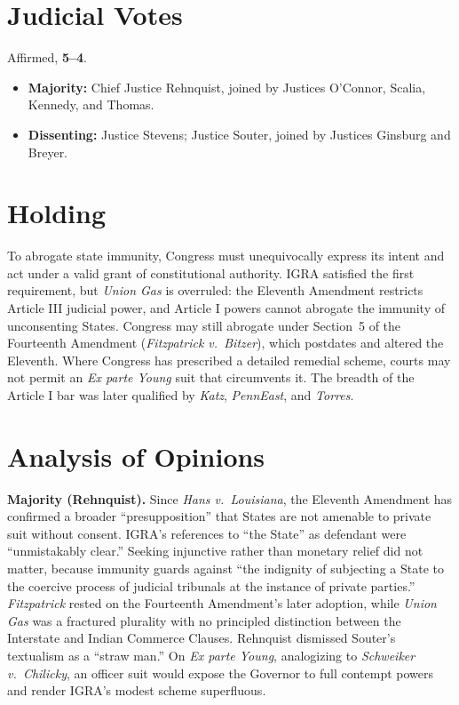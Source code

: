 \documentclass[12pt]{article}
\begin{document}
\section{Judicial Votes}

Affirmed, \textbf{5--4}.
\begin{itemize}
\item \textbf{Majority:} Chief Justice Rehnquist, joined by Justices O'Connor, Scalia, Kennedy, and Thomas.
\item \textbf{Dissenting:} Justice Stevens; Justice Souter, joined by Justices Ginsburg and Breyer.
\end{itemize}

\section{Holding}

To abrogate state immunity, Congress must unequivocally express its intent and act under a valid grant of constitutional authority. IGRA satisfied the first requirement, but \textit{Union Gas} is overruled: the Eleventh Amendment restricts Article III judicial power, and Article I powers cannot abrogate the immunity of unconsenting States. Congress may still abrogate under Section~5 of the Fourteenth Amendment (\textit{Fitzpatrick v.\ Bitzer}), which postdates and altered the Eleventh. Where Congress has prescribed a detailed remedial scheme, courts may not permit an \textit{Ex parte Young} suit that circumvents it. The breadth of the Article I bar was later qualified by \textit{Katz}, \textit{PennEast}, and \textit{Torres}.

\section{Analysis of Opinions}

\textbf{Majority (Rehnquist).} Since \textit{Hans v.\ Louisiana}, the Eleventh Amendment has confirmed a broader ``presupposition'' that States are not amenable to private suit without consent. IGRA's references to ``the State'' as defendant were ``unmistakably clear.'' Seeking injunctive rather than monetary relief did not matter, because immunity guards against ``the indignity of subjecting a State to the coercive process of judicial tribunals at the instance of private parties.'' \textit{Fitzpatrick} rested on the Fourteenth Amendment's later adoption, while \textit{Union Gas} was a fractured plurality with no principled distinction between the Interstate and Indian Commerce Clauses. Rehnquist dismissed Souter's textualism as a ``straw man.'' On \textit{Ex parte Young}, analogizing to \textit{Schweiker v.\ Chilicky}, an officer suit would expose the Governor to full contempt powers and render IGRA's modest scheme superfluous.
\end{document}
